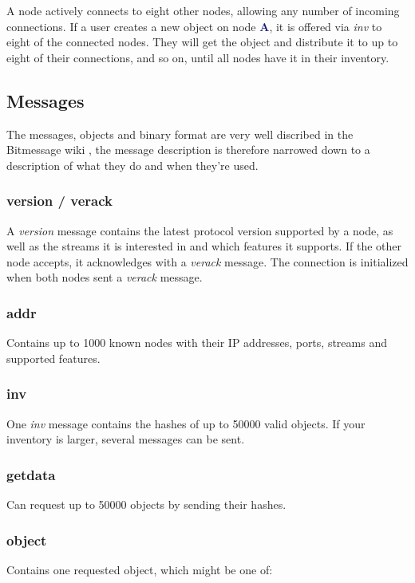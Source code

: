 \documentclass{bfh}
\newcommand{\msg}[1]{\textit{\textcolor{RedOrange}{#1}}}
\newcommand{\node}[1]{\textbf{\textcolor{MidnightBlue}{#1}}}
\begin{document}
  A node actively connects to eight other nodes, allowing any number of incoming connections. If a user creates a new object on node \node{A}, it is offered via \msg{inv} to eight of the connected nodes. They will get the object and distribute it to up to eight of their connections, and so on, until all nodes have it in their inventory.

  \subsection{Messages}

  The messages, objects and binary format are very well discribed in the Bitmessage wiki \cite{wiki:protocol}, the message description is therefore narrowed down to a description of what they do and when they're used.

  \subsubsection{version / verack}
  A \msg{version} message contains the latest protocol version supported by a node, as well as the streams it is interested in and which features it supports. If the other node accepts, it acknowledges with a \msg{verack} message. The connection is initialized when both nodes sent a \msg{verack} message.

  \subsubsection{addr}
  Contains up to 1000 known nodes with their IP addresses, ports, streams and supported features.

  \subsubsection{inv}
  One \msg{inv} message contains the hashes of up to 50000 valid objects. If your inventory is larger, several messages can be sent.

  \subsubsection{getdata}
  Can request up to 50000 objects by sending their hashes.

  \subsubsection{object}
  Contains one requested object, which might be one of:
\end{document}
